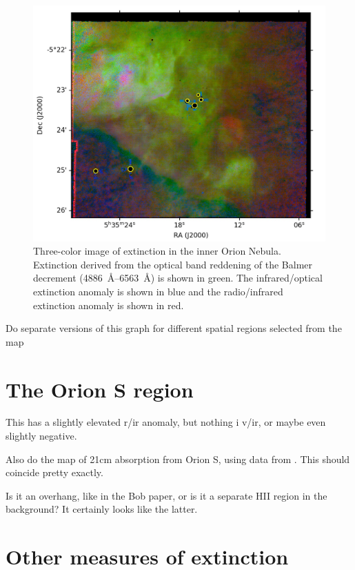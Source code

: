 \documentclass[twocolumn, times]{aastex63}
\begin{document}
\begin{figure}
  \includegraphics[width=\linewidth]{figs/rgb-lupton-extinction}
  \caption{Three-color image of extinction in the inner Orion
    Nebula. Extinction derived from the optical band reddening of the
    Balmer decrement (\SIrange{4886}{6563}{\angstrom}) is shown in
    green.  The infrared/optical extinction anomaly is shown in blue
    and the radio/infrared extinction anomaly is shown in red.}
  \label{fig:3color-extinction}
\end{figure}

Do separate versions of this graph for different spatial regions selected from the map


\section{The Orion S region}
\label{sec:orion-s-region}

This has a slightly elevated r/ir anomaly, but nothing i v/ir, or maybe even slightly negative.

Also do the map of 21cm absorption from Orion S, using data from \citet{van-der-Werf:2013a}.  This should coincide pretty exactly.

Is it an overhang, like in the Bob paper, or is it a separate HII region in the background?
It certainly looks like the latter.

\section{Other measures of extinction}
\label{sec:other-meas-extinct}
\end{document}

